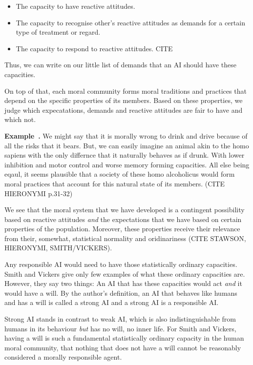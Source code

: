 \documentclass{article}
\newcounter{example}
\newenvironment{example}[1][]{\refstepcounter{example}\par\medskip
   \noindent \textbf{Example~\theexample. #1} \rmfamily}{\medskip}
\begin{document}
\begin{itemize}
	\item The capacity to have reactive attitudes.
	\item The capacity to recognise other's reactive attitudes as demands
		for a certain type of treatment or regard.
	\item The capacity to respond to reactive attitudes. CITE
\end{itemize}
Thus, we can write on our little list of demands that an AI should have these
capacities.

On top of that, each moral community forms moral traditions and practices that
depend on the specific properties of its members. Based on these properties, we
judge which expecatations, demands and reactive attitudes are fair to have and
which not.

\begin{example}
		We might say that it is morally wrong to drink and drive because
		of all the risks that it bears. But, we can easily imagine an
		animal akin to the homo sapiens with the only differnce that it
		naturally behaves as if drunk. With lower inhibition and motor
		control and worse memory forming capacities. All else being
		eqaul, it seems plausible that a society of these homo
		alcoholicus would form moral
		practices that account for this natural state of its members.
		(CITE HIERONYMI p.31-32)
\end{example}

We see that the moral system that we have developed is a contingent possibility
based on reactive attitudes \textit{and} the expectations that we have based on
certain properties of the population. Moreover, these properties
receive their relevance from their, somewhat, statistical normality and
oridinariness (CITE STAWSON, HIERONYMI, SMITH/VICKERS). 

Any responsible AI would need to have those statistically ordinary capacities.
Smith and Vickers give only few examples of what these ordinary capacities are.
However, they say two things: An AI that has these capacities would act
 \textit{and} it would have a will. 
By the author's definition, an AI that behaves like humans and has a will is
called a strong AI and a strong AI is a responsible AI. 

Strong AI stands in contrast to weak AI, which is also indistinguishable from
humans in its behaviour \textit{but} has no will, no inner life. For Smith and
Vickers, having a will is such a fundamental statistically ordinary capacity in
the human moral community, that nothing that does not have a will cannot be
reasonably considered a morally responsible agent.
\end{document}
